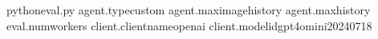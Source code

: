 \begin{MintedVerbatim}[commandchars=\\\{\}]
pythoneval.py
agent.typecustom
agent.max\PYGZus{}image\PYGZus{}history
agent.max\PYGZus{}history
eval.num\PYGZus{}workers
client.client\PYGZus{}nameopenai
client.model\PYGZus{}idgpt\PYGZhy{}4o\PYGZhy{}mini\PYGZhy{}2024\PYGZhy{}07\PYGZhy{}18
\end{MintedVerbatim}
